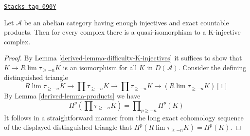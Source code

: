 \begin{lemma}
\label{derived-lemma-enough-K-injectives-Ab4-star}
\href{https://stacks.math.columbia.edu/tag/090Y}{\texttt{Stacks tag 090Y}}

Let $\mathcal{A}$ be an abelian category having enough injectives
and exact countable products. Then for every complex
there is a quasi-isomorphism to a K-injective complex.
\end{lemma}

\begin{proof}

By Lemma \ref{derived-lemma-difficulty-K-injectives} it suffices to show that
$K \to R\lim\tau_{\geq -n}K$ is an isomorphism for all $K$ in $D(\mathcal{A})$.
Consider the defining distinguished triangle
$$
R\lim\tau_{\geq -n}K \to
\prod \tau_{\geq -n}K \to
\prod \tau_{\geq -n}K \to
(R\lim\tau_{\geq -n}K)[1]
$$
By Lemma \ref{derived-lemma-products} we have
$$
H^p(\prod \tau_{\geq -n}K) = \prod\nolimits_{p \geq -n} H^p(K)
$$
It follows in a straightforward manner from the long exact cohomology
sequence of the displayed distinguished triangle
that $H^p(R\lim \tau_{\geq -n}K) = H^p(K)$.
\end{proof}

